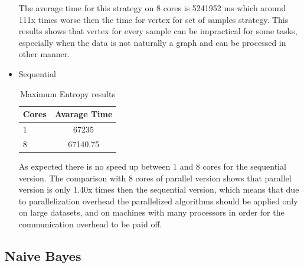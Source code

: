 \documentclass{report}
\begin{document}
\begin{itemize}
The average time for this strategy on 8 cores is 5241952 ms which around 111x times worse then the time for vertex for set of samples strategy. This results shows that vertex for every sample can be impractical for some tasks, especially when the data is not naturally a graph and can be processed in other manner.

\item{Sequential}

\begin{table}[!htb]
\centering
\begin{tabular}{ l c }
    \hline\hline
    Cores & Avarage Time \\ [0.2ex]
    \hline
    1 &  67235 \\
    8 & 67140.75  \\
    \hline
  \end{tabular}
\label{table:maxentres2}
\caption{Maximum Entropy results}
\end{table}

As expected there is no speed up between 1 and 8 cores for the sequential version.  The comparison with 8 cores of parallel version shows that parallel version is only 1.40x times then the sequential version, which means that due to parallelization overhead the parallelized algorithms should be applied only on large datasets, and on machines with many processors in order for the communication overhead to be paid off.

\end{itemize}

\subsection{Naive Bayes}
\end{document}
